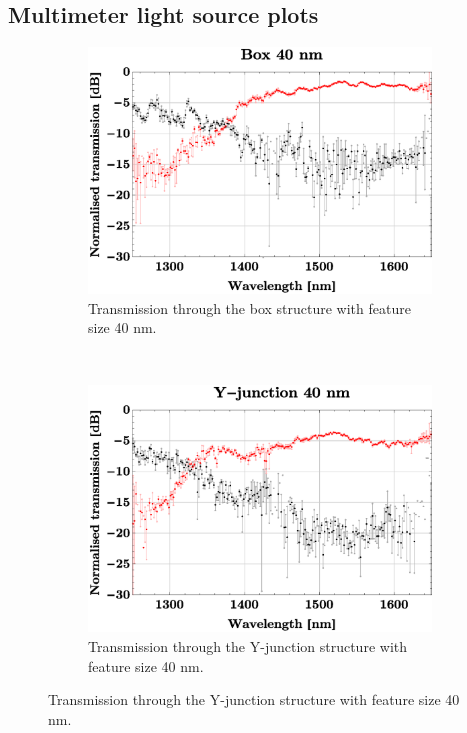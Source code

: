 \subsection{Multimeter light source plots}

\begin{figure}[H]
\begin{subfigure}[h]{0.50\textwidth}
        \centering
        \includegraphics[width=1.0\textwidth]
        {fig/Kilde2Multimeter/box40multimeterconcatenated.eps}
        \caption{Transmission through the box structure with feature size 40 nm.}
    \end{subfigure}%
    ~ 
    \begin{subfigure}[h]{0.50\textwidth}
        \centering
        \includegraphics[width=1.0\textwidth]
        {fig/Kilde2Multimeter/yjunc40multimeterconcatenated.eps}
        \caption{Transmission through the Y-junction structure with feature size 40 nm.}
    \end{subfigure}
    

\end{figure}
